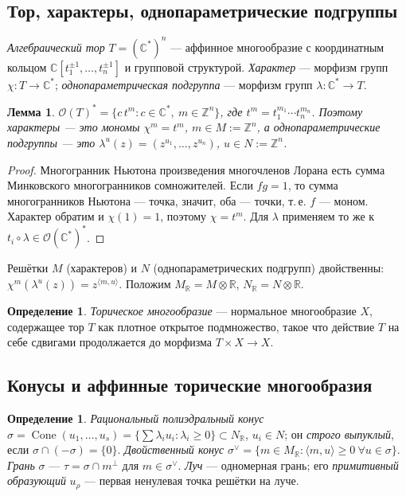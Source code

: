 \documentclass[11pt,a4paper]{article}
\theoremstyle{plain}
\newtheorem{lemma}[theorem]{Лемма}
\theoremstyle{definition}
\newtheorem{definition}[theorem]{Определение}
\theoremstyle{remark}
\renewcommand{\C}{\mathbb{C}}
\newcommand{\Z}{\mathbb{Z}}
\newcommand{\R}{\mathbb{R}}
\newcommand{\cO}{\mathcal{O}}
\DeclareMathOperator{\Cone}{Cone}
\begin{document}
\subsection{Тор, характеры, однопараметрические подгруппы}

\emph{Алгебраический тор} $T=(\C^*)^n$ --- аффинное многообразие с координатным кольцом
$\C[t_1^{\pm1},\dots,t_n^{\pm1}]$ и групповой структурой. \emph{Характер} --- морфизм групп
$\chi\colon T\to\C^*$; \emph{однопараметрическая подгруппа} --- морфизм групп $\lambda\colon\C^*\to T$.

\begin{lemma}\label{lem:units-torus}
$\cO(T)^*=\{c\,t^m: c\in\C^*,\ m\in\Z^n\}$, где $t^m=t_1^{m_1}\cdots t_n^{m_n}$. Поэтому характеры
--- это мономы $\chi^m=t^m$, $m\in M:=\Z^n$, а однопараметрические подгруппы --- это
$\lambda^u(z)=(z^{u_1},\dots,z^{u_n})$, $u\in N:=\Z^n$.
\end{lemma}
\begin{proof}
Многогранник Ньютона произведения многочленов Лорана есть сумма Минковского многогранников
сомножителей. Если $fg=1$, то сумма многогранников Ньютона --- точка, значит, оба --- точки, т.\,е.
$f$ --- моном. Характер обратим и $\chi(1)=1$, поэтому $\chi=t^m$. Для $\lambda$ применяем то же к
$t_i\circ\lambda\in\cO(\C^*)^*$.
\end{proof}

Решётки $M$ (характеров) и $N$ (однопараметрических подгрупп) двойственны:
$\chi^m(\lambda^u(z))=z^{\langle m,u\rangle}$. Положим $M_\R=M\otimes\R$, $N_\R=N\otimes\R$.

\begin{definition}
\emph{Торическое многообразие} --- нормальное многообразие $X$, содержащее тор $T$ как плотное
открытое подмножество, такое что действие $T$ на себе сдвигами продолжается до морфизма
$T\times X\to X$.
\end{definition}

\subsection{Конусы и аффинные торические многообразия}

\begin{definition}
\emph{Рациональный полиэдральный конус} $\sigma=\Cone(u_1,\dots,u_s)=\{\sum\lambda_iu_i:\lambda_i\ge0\}
\subset N_\R$, $u_i\in N$; он \emph{строго выпуклый}, если $\sigma\cap(-\sigma)=\{0\}$.
\emph{Двойственный конус} $\sigma^\vee=\{m\in M_\R:\langle m,u\rangle\ge0\ \forall u\in\sigma\}$.
\emph{Грань} $\sigma$ --- $\tau=\sigma\cap m^\perp$ для $m\in\sigma^\vee$. \emph{Луч} --- одномерная
грань; его \emph{примитивный образующий} $u_\rho$ --- первая ненулевая точка решётки на луче.
\end{definition}
\end{document}
